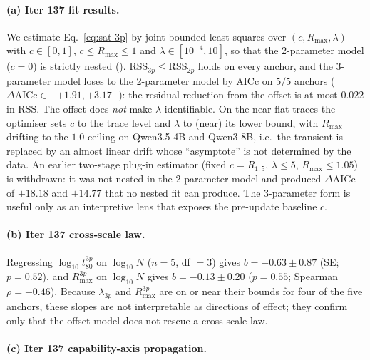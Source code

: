\paragraph{(a) Iter 137 fit results.}
\label{par:scaling-iter137-fits}

We estimate Eq.~\eqref{eq:sat-3p} by joint bounded least squares
over $(c, R_{\max}, \lambda)$ with $c \in [0,1]$, $c \le R_{\max} \le 1$
and $\lambda \in [10^{-4}, 10]$, so that the 2-parameter model ($c=0$)
is strictly nested ().
$\mathrm{RSS}_{3p} \le \mathrm{RSS}_{2p}$ holds on every anchor, and
the 3-parameter model loses to the 2-parameter model by AICc on $5/5$
anchors ($\Delta\mathrm{AICc} \in [+1.91, +3.17]$): the residual
reduction from the offset is at most $0.022$ in RSS.  The offset does
\emph{not} make $\lambda$ identifiable.  On the near-flat traces the
optimiser sets $c$ to the trace level and $\lambda$ to (near) its lower
bound, with $R_{\max}$ drifting to the $1.0$ ceiling on Qwen3.5-4B and
Qwen3-8B, i.e.\ the transient is replaced by an almost linear drift
whose ``asymptote'' is not determined by the data.  An earlier
two-stage plug-in estimator (fixed $c = \bar R_{1:5}$,
$\lambda \le 5$, $R_{\max} \le 1.05$) is withdrawn: it was not nested in
the 2-parameter model and produced $\Delta\mathrm{AICc}$ of $+18.18$ and
$+14.77$ that no nested fit can produce.  The 3-parameter form is
useful only as an interpretive lens that exposes the pre-update
baseline $c$.

\paragraph{(b) Iter 137 cross-scale law.}
\label{par:scaling-iter137-cross-scale}

Regressing $\log_{10} t_{80}^{3p}$ on $\log_{10} N$ ($n=5$, df $=3$)
gives $b = -0.63 \pm 0.87$ (SE; $p = 0.52$), and $R_{\max}^{3p}$ on
$\log_{10} N$ gives $b = -0.13 \pm 0.20$ ($p = 0.55$; Spearman
$\rho = -0.46$).  Because $\lambda_{3p}$ and $R_{\max}^{3p}$ are on or
near their bounds for four of the five anchors, these slopes are not
interpretable as directions of effect; they confirm only that the
offset model does not rescue a cross-scale law.

\paragraph{(c) Iter 137 capability-axis propagation.}
\label{par:scaling-iter137-capability}

